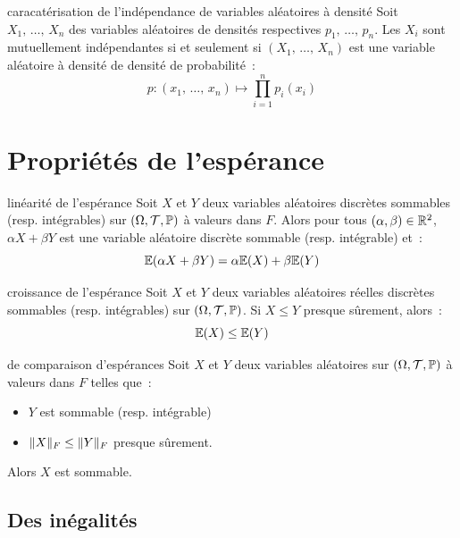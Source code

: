 
\begin{proposition}{}{caracatérisation de l'indépendance de variables aléatoires à densité}
    Soit $X_1,\, \dots,\, X_n$ des variables aléatoires de densités respectives $p_1,\, \dots,\,  p_n$. Les $X_i$ sont mutuellement indépendantes si et seulement si $(X_1,\, \dots,\, X_n)$ est une variable aléatoire à densité de densité de probabilité~:
    $$p : (x_1,\, \dots,\, x_n) \mapsto \prod_{i=1}^np_i(x_i)$$
\end{proposition}

\section{Propriétés de l'espérance}

\begin{theoreme}{}{linéarité de l'espérance}
    Soit $X$ et $Y$ deux variables aléatoires discrètes sommables (resp. intégrables) sur $(\Omega, \mathcal{T}, \mathbb{P})$ à valeurs dans $F$. Alors pour tous $(\alpha, \beta) \in \mathbb{R}^2$, $\alpha X + \beta Y$ est une variable aléatoire discrète sommable (resp. intégrable) et~:
    $$\mathbb{E}(\alpha X + \beta Y) = \alpha \mathbb{E}(X) + \beta \mathbb{E}(Y)$$
\end{theoreme}

\begin{theoreme}{}{croissance de l'espérance}
    Soit $X$ et $Y$ deux variables aléatoires réelles discrètes sommables (resp. intégrables) sur $(\Omega, \mathcal{T}, \mathbb{P})$. Si $X \leq Y$ presque sûrement, alors~:
    $$\mathbb{E}(X) \leq \mathbb{E}(Y)$$
\end{theoreme}

\begin{theoreme}{}{de comparaison d'espérances}
    Soit $X$ et $Y$ deux variables aléatoires sur $(\Omega, \mathcal{T}, \mathbb{P})$ à valeurs dans $F$ telles que~:
    \begin{itemize}
        \item $Y$ est sommable (resp. intégrable)
        \item $\lVert X\rVert_F \leq \lVert Y\rVert_F$ presque sûrement.
    \end{itemize}
    Alors $X$ est sommable.
\end{theoreme}

\subsection{Des inégalités}

